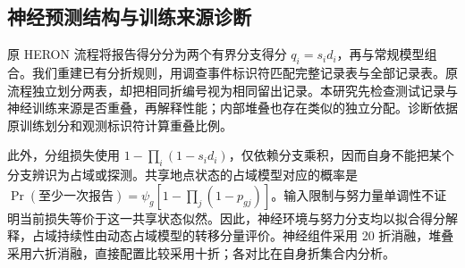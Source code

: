 
\subsection{神经预测结构与训练来源诊断}
\label{sec:audit}
原 HERON 流程将报告得分分为两个有界分支得分 $q_i=s_i d_i$，再与常规模型组合。我们重建已有分折规则，用调查事件标识符匹配完整记录表与全部记录表。原流程独立划分两表，却把相同折编号视为相同留出记录。本研究先检查测试记录与神经训练来源是否重叠，再解释性能；内部堆叠也存在类似的独立分配。诊断依据原训练划分和观测标识符计算重叠比例。

此外，分组损失使用 $1-\prod_i(1-s_i d_i)$，仅依赖分支乘积，因而自身不能把某个分支辨识为占域或探测。共享地点状态的占域模型对应的概率是 $\Pr(\text{至少一次报告})=\psi_g[1-\prod_j(1-p_{gj})]$。输入限制与努力量单调性不证明当前损失等价于这一共享状态似然。因此，神经环境与努力分支均以拟合得分解释，占域持续性由动态占域模型的转移分量评价。神经组件采用 20 折消融，堆叠采用六折消融，直接配置比较采用十折；各对比在自身折集合内分析。

\FloatBarrier
